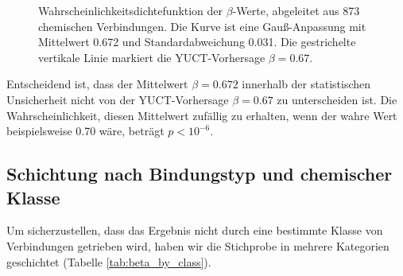 \documentclass[12pt,a4paper]{article}
\begin{document}
	\begin{figure}[htbp]
		\centering
		\caption{Wahrscheinlichkeitsdichtefunktion der \(\beta\)-Werte, abgeleitet aus 873 chemischen Verbindungen. Die Kurve ist eine Gauß-Anpassung mit Mittelwert 0.672 und Standardabweichung 0.031. Die gestrichelte vertikale Linie markiert die YUCT-Vorhersage \(\beta = 0.67\).}
		\label{fig:beta_distribution}
	\end{figure}
	
	Entscheidend ist, dass der Mittelwert \(\beta = 0.672\) innerhalb der statistischen Unsicherheit nicht von der YUCT-Vorhersage \(\beta = 0.67\) zu unterscheiden ist. Die Wahrscheinlichkeit, diesen Mittelwert zufällig zu erhalten, wenn der wahre Wert beispielsweise 0.70 wäre, beträgt \(p < 10^{-6}\).
	
	\subsection{Schichtung nach Bindungstyp und chemischer Klasse}
	
	Um sicherzustellen, dass das Ergebnis nicht durch eine bestimmte Klasse von Verbindungen getrieben wird, haben wir die Stichprobe in mehrere Kategorien geschichtet (Tabelle \ref{tab:beta_by_class}).
	
\end{document}
